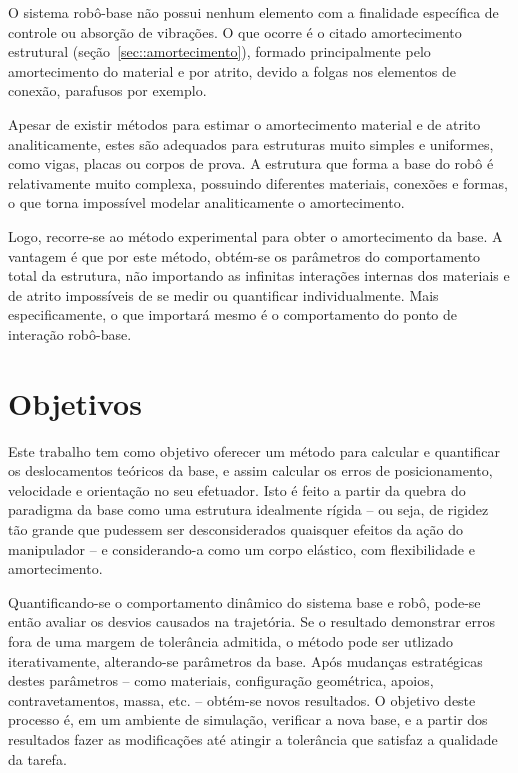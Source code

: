 O sistema robô-base não possui nenhum elemento com a finalidade específica de
controle ou absorção de vibrações. O que ocorre é o citado amortecimento
estrutural (seção~\ref{sec::amortecimento}), formado principalmente pelo
amortecimento do material  e por atrito,
devido a folgas nos elementos de conexão, parafusos por exemplo.

Apesar de existir métodos para estimar o amortecimento material e de atrito
analiticamente, estes são adequados para estruturas muito simples e uniformes,
como vigas, placas ou corpos de prova. A estrutura que forma a base do robô é
relativamente muito complexa, possuindo diferentes materiais, conexões e formas,
o que torna impossível modelar analiticamente o amortecimento.

Logo, recorre-se ao método experimental para obter o amortecimento da base.
A vantagem é que por este método, obtém-se os parâmetros do comportamento total
da estrutura, não importando as infinitas interações internas dos materiais e de
atrito impossíveis de se medir ou quantificar individualmente.
Mais especificamente, o que importará mesmo é o comportamento do ponto de
interação robô-base.


\section{Objetivos}

Este trabalho tem como objetivo oferecer um método para calcular e quantificar
os deslocamentos teóricos da base, e assim calcular os erros de posicionamento,
velocidade e orientação no seu efetuador. Isto é feito a partir da
quebra do paradigma da base como uma estrutura idealmente rígida -- ou seja, de
rigidez tão grande que pudessem ser desconsiderados quaisquer efeitos da ação do
manipulador -- e considerando-a como um corpo elástico, com flexibilidade e
amortecimento.

Quantificando-se o comportamento dinâmico do sistema base e robô, pode-se então
avaliar os desvios causados na trajetória. Se o resultado demonstrar erros fora
de uma margem de tolerância admitida, o método pode ser utlizado iterativamente,
alterando-se parâmetros da base.
Após mudanças estratégicas destes parâmetros -- como materiais, configuração
geométrica, apoios, contravetamentos, massa, etc. -- obtém-se novos resultados.
O objetivo deste processo é, em um ambiente de simulação, verificar a nova base,
e a partir dos resultados fazer as modificações até atingir a tolerância que
satisfaz a qualidade da tarefa.

